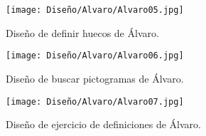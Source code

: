 \begin{figure}[ht!]
  \centering
  \texttt{[image: Diseño/Alvaro/Alvaro05.jpg]}
  \caption{Diseño de definir huecos de Álvaro.}
  \label{fig:disenyoAlvaro04}
\end{figure}

\begin{figure}[ht!]
  \centering
  \texttt{[image: Diseño/Alvaro/Alvaro06.jpg]}
  \caption{Diseño de buscar pictogramas de Álvaro.}
  \label{fig:disenyoAlvaro05}
\end{figure}

\begin{figure}[ht!]
  \centering
  \texttt{[image: Diseño/Alvaro/Alvaro07.jpg]}
  \caption{Diseño de ejercicio de definiciones de Álvaro.}
  \label{fig:disenyoAlvaro06}
\end{figure}